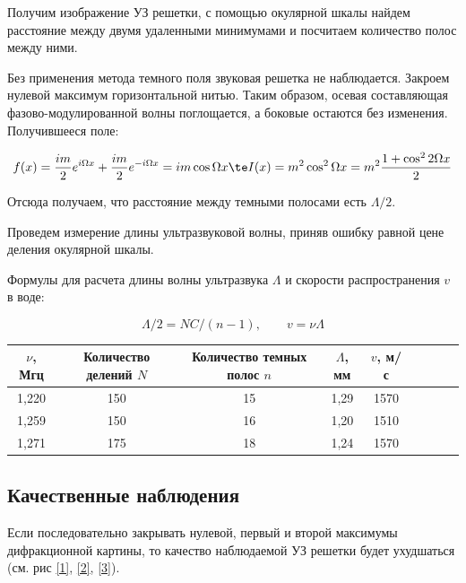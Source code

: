 	Получим изображение УЗ решетки, с помощью окулярной шкалы найдем расстояние между двумя удаленными минимумами и посчитаем количество полос между ними.
	
	Без применения метода темного поля звуковая решетка не наблюдается. Закроем нулевой максимум горизонтальной нитью. Таким образом, осевая составляющая фазово-модулированной волны поглощается, а боковые остаются без изменения. Получившееся поле: 
	
	\begin{equation}\label{}
	f(x) = \dfrac{im}{2} e^{i\Omega x} +  \dfrac{im}{2} e^{-i\Omega x} = im \cos \Omega x \te I(x) = m^2 \cos ^2 \Omega x = m^2 \dfrac{1 + \cos ^2 2 \Omega x}{2}
	\end{equation}
	
	Отсюда получаем, что расстояние между темными полосами есть $ \Lambda/2 $.
	
	Проведем измерение длины ультразвуковой волны, приняв ошибку равной цене деления окулярной шкалы.
	
	Формулы для расчета длины волны ультразвука $ \Lambda $ и скорости распространения $ v $ в воде:
	
	\begin{equation}\label{}
	\Lambda/2  = NC/(n - 1),  \qquad v = \nu\Lambda
	\end{equation}
	
	\begin{table}
		\centering
		\begin{tabular}{|c|c|c|c|c|c|c|c|c|}
			\hline
			$\nu$, Мгц & Количество делений $N$ & Количество темных полос $n$ & $\Lambda$, мм & $v$, м/с \\ \hline
			1,220 & 150 & 15 & 1,29 & 1570 \\ \hline
			1,259 & 150 & 16 & 1,20 & 1510 \\ \hline
			1,271 & 175 & 18 & 1,24 & 1570 \\ \hline
		\end{tabular}
	\end{table}

	\subsection*{Качественные наблюдения}
	
	Если последовательно закрывать нулевой, первый и второй максимумы дифракционной картины, то качество наблюдаемой УЗ решетки будет ухудшаться (см. рис \ref{1}, \ref{2}, \ref{3}).
	

